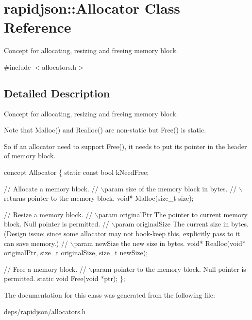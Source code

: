 \hypertarget{classrapidjson_1_1_allocator}{}\section{rapidjson\+:\+:Allocator Class Reference}
\label{classrapidjson_1_1_allocator}


Concept for allocating, resizing and freeing memory block.  




{\ttfamily \#include $<$allocators.\+h$>$}



\subsection{Detailed Description}
Concept for allocating, resizing and freeing memory block. 

Note that Malloc() and Realloc() are non-\/static but Free() is static.

So if an allocator need to support Free(), it needs to put its pointer in the header of memory block.


\begin{DoxyCode}
concept Allocator \{
    \textcolor{keyword}{static} \textcolor{keyword}{const} \textcolor{keywordtype}{bool} kNeedFree;    

    \textcolor{comment}{// Allocate a memory block.}
    \textcolor{comment}{// \(\backslash\)param size of the memory block in bytes.}
    \textcolor{comment}{// \(\backslash\)returns pointer to the memory block.}
    \textcolor{keywordtype}{void}* Malloc(\textcolor{keywordtype}{size\_t} size);

    \textcolor{comment}{// Resize a memory block.}
    \textcolor{comment}{// \(\backslash\)param originalPtr The pointer to current memory block. Null pointer is permitted.}
    \textcolor{comment}{// \(\backslash\)param originalSize The current size in bytes. (Design issue: since some allocator may not book-keep
       this, explicitly pass to it can save memory.)}
    \textcolor{comment}{// \(\backslash\)param newSize the new size in bytes.}
    \textcolor{keywordtype}{void}* Realloc(\textcolor{keywordtype}{void}* originalPtr, \textcolor{keywordtype}{size\_t} originalSize, \textcolor{keywordtype}{size\_t} newSize);

    \textcolor{comment}{// Free a memory block.}
    \textcolor{comment}{// \(\backslash\)param pointer to the memory block. Null pointer is permitted.}
    \textcolor{keyword}{static} \textcolor{keywordtype}{void} Free(\textcolor{keywordtype}{void} *ptr);
\};
\end{DoxyCode}
 

The documentation for this class was generated from the following file\+:\begin{DoxyCompactItemize}
\item 
deps/rapidjson/allocators.\+h\end{DoxyCompactItemize}
